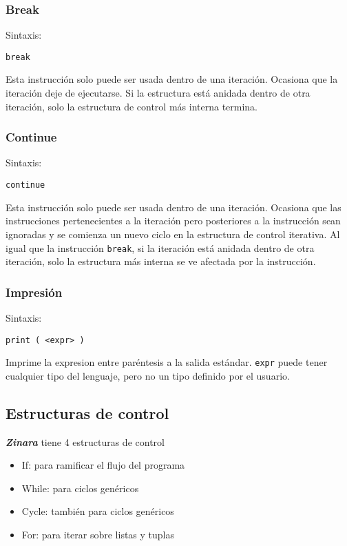 \documentclass[12pt, spanish]{report}
\begin{document}
\subsubsection{Break}
\label{sec:return}
Sintaxis:
\begin{verbatim}
break
\end{verbatim}

Esta instrucci\'on solo puede ser usada dentro de una
iteraci\'on. Ocasiona que la iteraci\'on deje de ejecutarse.
Si la estructura est\'a anidada dentro de otra iteraci\'on, 
solo la estructura de control m\'as interna termina.

\subsubsection{Continue}
\label{sec:return}
Sintaxis:
\begin{verbatim}
continue
\end{verbatim}

Esta instrucci\'on solo puede ser usada dentro de una
iteraci\'on. Ocasiona que las instrucciones pertenecientes a la
iteraci\'on pero posteriores a la instrucci\'on sean ignoradas y se
comienza un nuevo ciclo en la estructura de control iterativa.
Al igual que la instrucci\'on \texttt{break}, si la iteraci\'on est\'a
anidada dentro de otra iteraci\'on, solo la estructura m\'as interna se
ve afectada por la instrucci\'on.

\subsubsection{Impresi\'on}
Sintaxis:
\begin{verbatim}
print ( <expr> )
\end{verbatim}

Imprime la expresion entre par\'entesis a la salida est\'andar. \texttt{expr}
puede tener cualquier tipo del lenguaje, pero no un tipo definido por el usuario.

\subsection{Estructuras de control}
\label{sec:ecntrl}
\emph{\textbf{Zinara}} tiene 4 estructuras de control
\begin{itemize}
\item If: para ramificar el flujo del programa
\item While: para ciclos gen\'ericos
\item Cycle: tambi\'en para ciclos gen\'ericos
\item For: para iterar sobre listas y tuplas
\end{itemize}
\end{document}
